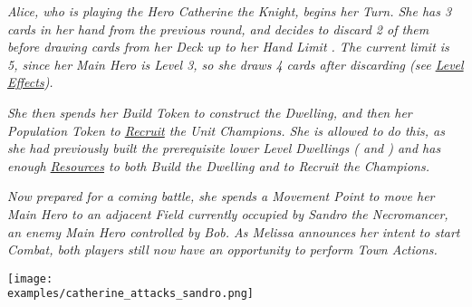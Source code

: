 \begin{multicols}{2}
\textit{Alice, who is playing the Hero Catherine the Knight, begins her Turn.
She has 3 cards in her hand from the previous round, and decides to discard 2 of them before drawing cards from her Deck up to her Hand Limit .
The current limit is 5, since her Main Hero is Level 3, so she draws 4 cards after discarding (see \hyperlink{Level}{Level Effects}).}\par
\textit{She then spends her Build Token to construct the  Dwelling, and then her Population Token to \hyperlink{Units}{Recruit} the  Unit Champions.
She is allowed to do this, as she had previously built the prerequisite lower Level Dwellings ( and ) and has enough \hyperlink{Resources}{Resources} to both Build the Dwelling and to Recruit the Champions.}\par
\textit{Now prepared for a coming battle, she spends a Movement Point to move her Main Hero to an adjacent Field currently occupied by Sandro the Necromancer, an enemy Main Hero controlled by Bob.
As Melissa announces her intent to start Combat, both players still now have an opportunity to perform Town Actions.}\par

\texttt{[image: \\examples/catherine\_attacks\_sandro.png]}

\end{multicols}
